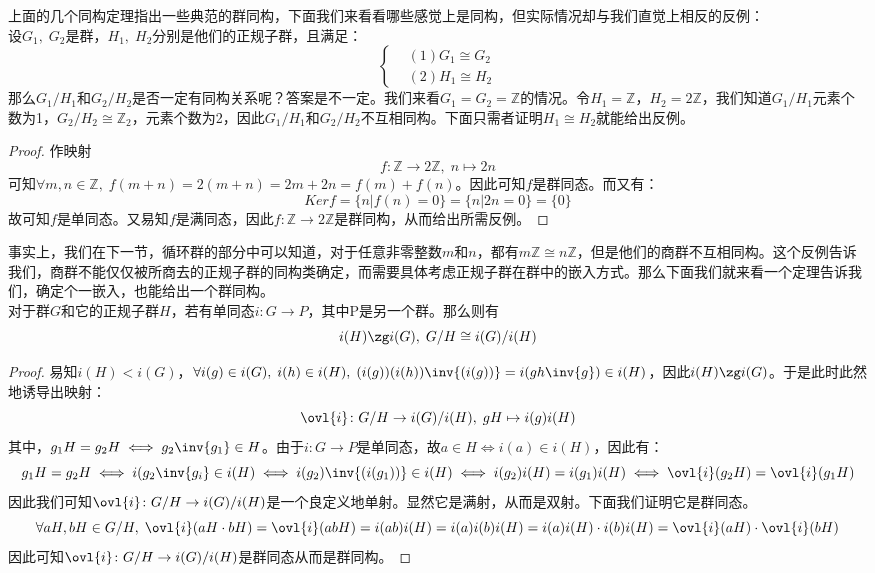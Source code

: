 \indent 上面的几个同构定理指出一些典范的群同构，下面我们来看看哪些感觉上是同构，但实际情况却与我们直觉上相反的反例：\\
设$G_1,\; G_2$是群，$H_1,\; H_2$分别是他们的正规子群，且满足：
\[
\left\{
\begin{aligned}
&(1) G_1\cong G_2\\
&(2) H_1\cong H_2
\end{aligned}\right.
\]
\indent 那么$G_1/H_1$和$G_2/H_2$是否一定有同构关系呢？答案是不一定。我们来看$G_1=G_2=\mathbb{Z}$的情况。令$H_1=\mathbb{Z}$，$H_2=2\mathbb{Z}$，我们知道$G_1/H_1$元素个数为1，$G_2/H_2\cong \mathbb{Z}_2$，元素个数为2，因此$G_1/H_1$和$G_2/H_2$不互相同构。下面只需者证明$H_1\cong H_2$就能给出反例。
\begin{proof}
作映射
\[
f\colon \mathbb{Z}\to 2\mathbb{Z},\; n\mapsto 2n
\]
可知$\forall m,n\in \mathbb{Z},\; f(m+n)=2(m+n)=2m+2n=f(m)+f(n)$。因此可知$f$是群同态。而又有：
\[
Kerf=\{n|f(n)=0\}=\{n|2n=0\}=\{0\}
\]
故可知$f$是单同态。又易知$f$是满同态，因此$f\colon \mathbb{Z}\to 2\mathbb{Z}$是群同构，从而给出所需反例。
\end{proof}
\indent 事实上，我们在下一节，循环群的部分中可以知道，对于任意非零整数$m$和$n$，都有$m\mathbb{Z}\cong n\mathbb{Z}$，但是他们的商群不互相同构。这个反例告诉我们，商群不能仅仅被所商去的正规子群的同构类确定，而需要具体考虑正规子群在群中的嵌入方式。那么下面我们就来看一个定理告诉我们，确定个一嵌入，也能给出一个群同构。\\
对于群$G$和它的正规子群$H$，若有单同态$i\colon G\to P$，其中P是另一个群。那么则有
\[
i(H)\zg i(G),\; G/H\cong i(G)/i(H)
\]
\begin{proof}
\indent 易知$i(H)<i(G)$，$\forall i(g)\in i(G),\; i(h)\in i(H),\; (i(g))(i(h))\inv{(i(g))}=i(gh\inv{g})\in i(H)$，因此$i(H)\zg i(G)$。于是此时此然地诱导出映射：
\[
\ovl{i}\colon G/H\to i(G)/i(H),\; gH\mapsto i(g)i(H)
\]
\indent 其中，$g_1H=g_2H\iff g_2\inv{g_1}\in H$。由于$i\colon G\to P$是单同态，故$a\in H\iff i(a)\in i(H)$，因此有：
\[
g_1H=g_2H\iff i(g_2\inv{g_i}\in i(H)\iff i(g_2)\inv{(i(g_1))}\in i(H)\iff i(g_2)i(H)=i(g_1)i(H)\iff \ovl{i}(g_2H)=\ovl{i}(g_1H)
\]
因此我们可知$\ovl{i}\colon G/H\to i(G)/i(H)$是一个良定义地单射。显然它是满射，从而是双射。下面我们证明它是群同态。
\[
\forall aH,bH\in G/H,\; \ovl{i}(aH\cdot bH)=\ovl{i}(abH)=i(ab)i(H)=i(a)i(b)i(H)=i(a)i(H)\cdot i(b)i(H)=\ovl{i}(aH)\cdot \ovl{i}(bH)
\]
因此可知$\ovl{i}\colon G/H\to i(G)/i(H)$是群同态从而是群同构。
\end{proof}

